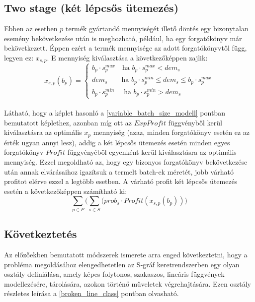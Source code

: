 \subsection{Two stage (két lépcsős ütemezés)} \label{TwoStage}
Ebben az esetben $p$ termék gyártandó mennyiségét illető döntés egy bizonytalan esemény bekövetkezése után is meghozható, például, ha egy forgatókönyv már bekövetkezett. Éppen ezért a termék mennyisége az adott forgatókönyvtől függ, legyen ez: $x_{s,p}$. E mennyiség kiválasztása a következőképpen zajlik:
\begin{equation*}
x_{s,p}(b_p)= \begin{cases}
            b_p \cdot s_p^{max} \quad \text{ha } b_p \cdot s_p^{max}<dem_{s}\\
            dem_{s} \qquad \text{ha } b_p \cdot s_p^{min} \leq dem_{s} \leq b_p \cdot s_p^{max}\\
            b_p \cdot s_p^{min} \quad \text{ ha } b_p \cdot s_p^{min}>dem_{s}
       \end{cases}       
\end{equation*}\\
Látható, hogy a képlet hasonló a \ref{variable_batch_size_modell} pontban bemutatott képlethez, azonban míg ott  az $ExpProfit$ függvényből kerül kiválasztásra az optimális $x_p$ mennyiség (azaz, minden forgatókönyv esetén ez az érték ugyan annyi lesz), addig a két lépcsős ütemezés esetén minden egyes forgatókönyv $Profit$ függvényéből egyenként kerül kiválasztásra az optimális mennyiség. Ezzel megoldható az, hogy egy bizonyos forgatókönyv bekövetkezése után annak elvárásaihoz igazítsuk a termelt batch-ek méretét, jobb várható profitot elérve ezzel a legtöbb esetben. A várható profit két lépcsős ütemezés esetén a következőképpen számítható ki:
$$\sum_{p \in P} \bigg( \sum_{s \in S}(prob_s \cdot Profit(x_{s,p}(b_p)) \bigg)$$ 
\subsection{Következtetés} \label{broken_line_suggestion}
Az előzőekben bemutatott módszerek ismerete arra enged következtetni, hogy a probléma megoldásához elengedhetetlen az S-gráf keretrendszerben egy olyan osztály definiálása, amely képes  folytonos, szakaszos, lineáris függvények modellezésére, tárolására, azokon történő műveletek végrehajtására. Ezen osztály részletes leírása a \ref{broken_line_class} pontban olvasható.
